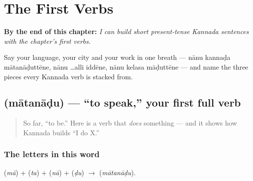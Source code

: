 
\chapter{The First Verbs}
\label{ch:first-verbs}

\begin{chapteropening}
\textbf{By the end of this chapter:} \emph{I can build short present-tense Kannada sentences with the chapter's first verbs.}

Say your language, your city and your work in one breath — nānu kannaḍa mātanāḍuttēne, nānu …alli iddēne, nānu kelasa māḍuttēne — and name the three pieces every Kannada verb is stacked from.
\end{chapteropening}

\section[\texorpdfstring{\kn{ಮಾತನಾಡು} (mātanāḍu)}{ಮಾತನಾಡು (mātanāḍu)}]{ (mātanāḍu) — \textquotedblleft{}to speak,\textquotedblright{} your first full verb}

\label{lesson:KA-C05-maatanaadu}



\begin{quote}
So far, \textquotedblleft{}to be.\textquotedblright{} Here is a verb that \emph{does} something — and it shows how Kannada builds \textquotedblleft{}I do X.\textquotedblright{}
\end{quote}

\subsection*{The letters in this word}
\textbf{} (\emph{mā}) + \textbf{} (\emph{ta}) + \textbf{} (\emph{nā}) + \textbf{} (\emph{ḍu}) $\to$ \textbf{} (\emph{mātanāḍu}).

